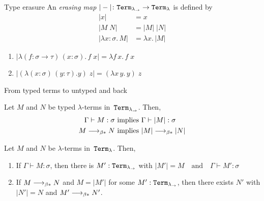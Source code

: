 \begin{frame}{Type erasure}
  An \emph{erasing map} $|-|\colon \mathtt{Term}_{\lambda_\to} \to \mathtt{Term}_{\lambda}$ is defined by
  \begin{align*}
    |x| & = x \\
    |M\; N| & = |M|\;|N| \\
    |\lambda x:\sigma.\, M| & = \lambda x.\, |M|
  \end{align*}
  \begin{enumerate}
    \item $|\lambda (f: \sigma \to \tau)\,(x: \sigma).\, f\;x| = \lambda f\, x.\, f\;x$
    \item $|(\lambda (x: \sigma)\,(y: \tau). y)\;z| = (\lambda x\,y.\, y)\; z$
  \end{enumerate}
  
\end{frame}
\begin{frame}{From typed terms to untyped and back}
\begin{proposition}
  Let $M$ and $N$ be typed $\lambda$-terms in~$\mathtt{Term}_{\lambda_\to}$. Then, 
  \begin{align*}
    \Gamma  \vdash M : \sigma & \text{ implies } \Gamma \vdash |M| :
    \sigma \\ 
    M \longrightarrow_{\beta*} N & \text{ implies } |M| \longrightarrow_{\beta*} |N|
  \end{align*}
\end{proposition}

\begin{proposition}
  Let $M$ and $N$ be $\lambda$-terms in~$\mathtt{Term}_{\lambda}$. Then, 
  \begin{enumerate}
  \item If $\Gamma \vdash M : \sigma$, then there is $M' : \mathtt{Term}_{\lambda_\to}$ with 
        $|M'| = M
        \quad\text{and}\quad
        \Gamma \vdash M' : \sigma$
      \item If $M \longrightarrow_{\beta*} N$ and $M = |M'|$ for some $M' : \mathtt{Term}_{\lambda_\to}$,
      then there exists $N'$ with $|N'| = N$ and $M' \longrightarrow_{\beta*} N'$.
    \end{enumerate}
\end{proposition}
\end{frame}

